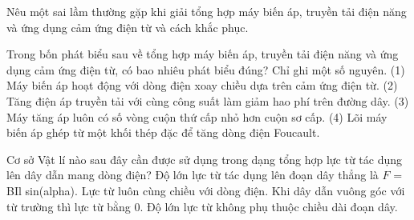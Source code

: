\begin{bt}
Nêu một sai lầm thường gặp khi giải tổng hợp máy biến áp, truyền tải điện năng và ứng dụng cảm ứng điện từ và cách khắc phục.
\end{bt}

\begin{ex}
Trong bốn phát biểu sau về tổng hợp máy biến áp, truyền tải điện năng và ứng dụng cảm ứng điện từ, có bao nhiêu phát biểu đúng? Chỉ ghi một số nguyên. (1) Máy biến áp hoạt động với dòng điện xoay chiều dựa trên cảm ứng điện từ. (2) Tăng điện áp truyền tải với cùng công suất làm giảm hao phí trên đường dây. (3) Máy tăng áp luôn có số vòng cuộn thứ cấp nhỏ hơn cuộn sơ cấp. (4) Lõi máy biến áp ghép từ một khối thép đặc để tăng dòng điện Foucault.
\end{ex}

\begin{ex}
Cơ sở Vật lí nào sau đây cần được sử dụng trong dạng tổng hợp lực từ tác dụng lên dây dẫn mang dòng điện?
\choice
{\True Độ lớn lực từ tác dụng lên đoạn dây thẳng là $F$ = BIl sin(alpha).}
{Lực từ luôn cùng chiều với dòng điện.}
{Khi dây dẫn vuông góc với từ trường thì lực từ bằng 0.}
{Độ lớn lực từ không phụ thuộc chiều dài đoạn dây.}
\end{ex}

